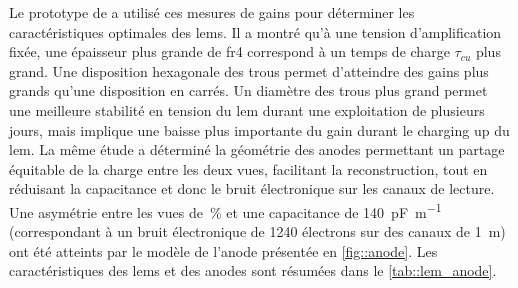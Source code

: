       Le prototype de \threeL{} a utilisé ces mesures de gains pour déterminer les caractéristiques optimales des \glspl{lem}. Il a montré qu'à une tension d'amplification fixée, une épaisseur plus grande de \gls{fr4} correspond à un temps de charge $\tau_{cu}$ plus grand. Une disposition hexagonale des trous permet d'atteindre des gains plus grands qu'une disposition en carrés. Un diamètre des trous plus grand permet une meilleure stabilité en tension du \gls{lem} durant une exploitation de plusieurs jours, mais implique une baisse plus importante du gain durant le charging up du \gls{lem}. La même étude a déterminé la géométrie des anodes permettant un partage équitable de la charge entre les deux vues, facilitant la reconstruction, tout en réduisant la capacitance et donc le bruit électronique sur les canaux de lecture. Une asymétrie entre les vues de \,\% et une capacitance de \SI{140}{\pico\farad\per\meter} (correspondant à un bruit électronique de 1240 électrons sur des canaux de \SI{1}{\meter}) ont été atteints par le modèle de l'anode présentée en \autoref{fig::anode}. Les caractéristiques des \glspl{lem} et des anodes sont résumées dans le \autoref{tab::lem_anode}.


